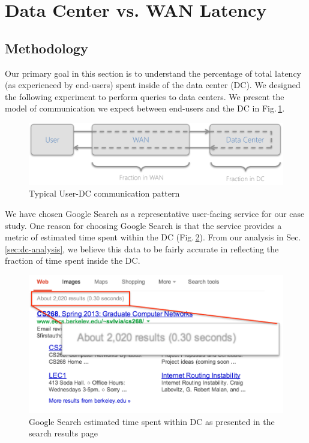 \section{Data Center vs. WAN Latency}
\label{sec:latency-DC}

\subsection{Methodology}
Our primary goal in this section is to understand the percentage of total latency (as experienced by end-users) spent inside of the data center (DC). We designed the following experiment to perform queries to data centers. We present the model of communication we expect between end-users and the DC in Fig.\,\ref{fig:DC_model}.

\begin{figure}
  \centering
  \includegraphics[width=\linewidth]{../figs/DC_model.pdf}
  \vspace{-1em}
  \caption{Typical User-DC communication pattern}
  \label{fig:DC_model}
\end{figure}

We have chosen Google Search as a representative user-facing service for our case study. One reason for choosing Google Search is that the service provides a metric of estimated time spent within the DC (Fig.\,\ref{fig:google_time}). From our analysis in Sec.\,\ref{sec:dc-analysis}, we believe this data to be fairly accurate in reflecting the fraction of time spent inside the DC.

\begin{figure}[t]
  \centering
  \includegraphics[width=0.85\linewidth]{../figs/GoogleTime.pdf}
  \vspace{-0.7em}
  \caption{Google Search estimated time spent within DC as presented in the search results page}
  \label{fig:google_time}
\end{figure}


